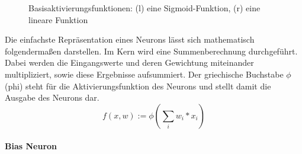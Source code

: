 \begin{figure}[ht!]
\centering
	\caption{Basisaktivierungsfunktionen: (l) eine Sigmoid-Funktion, (r) eine lineare Funktion}
	\label{fig:Aktivierungsfunktion}
\end{figure}

\noindent 
Die einfachste Repräsentation eines Neurons lässt sich mathematisch folgendermaßen darstellen.
Im Kern wird eine Summenberechnung durchgeführt. 
Dabei werden die Eingangswerte und deren Gewichtung miteinander multipliziert, sowie diese Ergebnisse aufsummiert.
Der griechische Buchstabe $\phi$ (phi) steht für die Aktivierungsfunktion des Neurons und stellt damit die Ausgabe des Neurons dar.
\begin{equation}
	f(x, w) := \phi ( \sum\limits_{i}{w_i * x_i})
	\label{eq:Aktivierungsfunktion}
\end{equation}


\paragraph{Bias Neuron} 
\label{sec:Bias Neuron}

